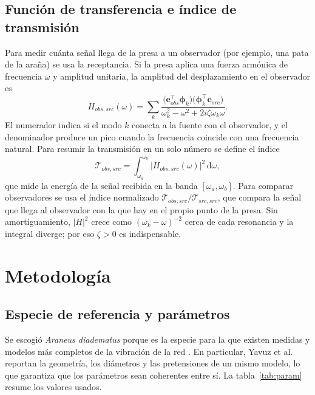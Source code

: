 \documentclass[11pt,letterpaper]{article}
\begin{document}
\subsection{Función de transferencia e índice de transmisión}

Para medir cuánta señal llega de la presa a un observador (por ejemplo, una
pata de la araña) se usa la receptancia. Si la presa aplica una fuerza
armónica de frecuencia $\omega$ y amplitud unitaria, la amplitud del
desplazamiento en el observador es \cite{ewins2000}
\begin{equation}\label{eq:H_amort}
    H_{obs,src}(\omega)=\sum_{k}
    \frac{\bigl(\mathbf{e}_{obs}^\top\boldsymbol{\phi}_k\bigr)
          \bigl(\boldsymbol{\phi}_k^\top\mathbf{e}_{src}\bigr)}
         {\omega_k^2-\omega^2+2i\zeta\omega_k\omega}.
\end{equation}
El numerador indica si el modo $k$ conecta a la fuente con el observador, y
el denominador produce un pico cuando la frecuencia coincide con una
frecuencia natural. Para resumir la transmisión en un solo número se define
el índice
\begin{equation}\label{eq:indice}
    \mathcal{T}_{obs,src}=\int_{\omega_a}^{\omega_b}\bigl|H_{obs,src}(\omega)\bigr|^2\,\mathrm{d}\omega ,
\end{equation}
que mide la energía de la señal recibida en la banda $[\omega_a,\omega_b]$.
Para comparar observadores se usa el índice normalizado
$\mathcal{T}_{obs,src}/\mathcal{T}_{src,src}$, que compara la señal que llega
al observador con la que hay en el propio punto de la presa. Sin
amortiguamiento, $|H|^2$ crece como $(\omega_k-\omega)^{-2}$ cerca de cada
resonancia y la integral diverge; por eso $\zeta>0$ es indispensable.

\section{Metodología}\label{sec:metodologia}

\subsection{Especie de referencia y parámetros}

Se escogió \textit{Araneus diadematus} porque es la especie para la que
existen medidas y modelos más completos de la vibración de la red
\cite{mortimer2016,mortimer2019decoding,yavuz2024}. En particular, Yavuz et
al.\ \cite{yavuz2024} reportan la geometría, los diámetros y las
pretensiones de un mismo modelo, lo que garantiza que los parámetros sean
coherentes entre sí. La tabla~\ref{tab:param} resume los valores usados.
\end{document}
